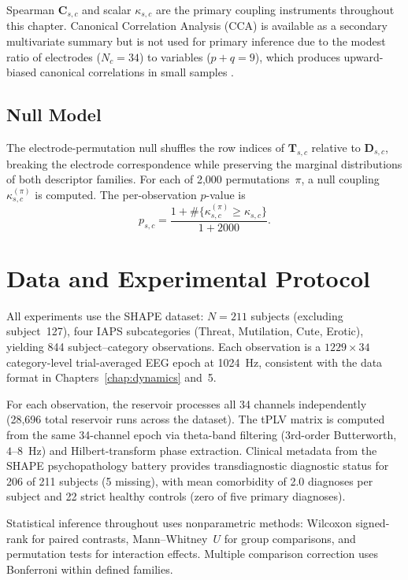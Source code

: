 Spearman $\mathbf{C}_{s,c}$ and scalar $\kappa_{s,c}$ are the primary coupling instruments throughout this chapter. Canonical Correlation Analysis (CCA) is available as a secondary multivariate summary but is not used for primary inference due to the modest ratio of electrodes ($N_c = 34$) to variables ($p + q = 9$), which produces upward-biased canonical correlations in small samples \cite{wang_cca_2020}.

\subsection{Null Model}

The electrode-permutation null shuffles the row indices of $\mathbf{T}_{s,c}$ relative to $\mathbf{D}_{s,c}$, breaking the electrode correspondence while preserving the marginal distributions of both descriptor families. For each of 2,000 permutations~$\pi$, a null coupling $\kappa_{s,c}^{(\pi)}$ is computed. The per-observation $p$-value is
\begin{equation}
p_{s,c} = \frac{1 + \#\{\kappa_{s,c}^{(\pi)} \ge \kappa_{s,c}\}}{1 + 2000}.
\end{equation}


\section{Data and Experimental Protocol}
\label{sec:ch7_protocol}

All experiments use the SHAPE dataset: $N = 211$ subjects (excluding subject~127), four IAPS subcategories (Threat, Mutilation, Cute, Erotic), yielding 844 subject--category observations. Each observation is a $1229 \times 34$ category-level trial-averaged EEG epoch at 1024~Hz, consistent with the data format in Chapters~\ref{chap:dynamics} and~5.

For each observation, the reservoir processes all 34 channels independently (28,696 total reservoir runs across the dataset). The tPLV matrix is computed from the same 34-channel epoch via theta-band filtering (3rd-order Butterworth, $4$--$8$~Hz) and Hilbert-transform phase extraction. Clinical metadata from the SHAPE psychopathology battery provides transdiagnostic diagnostic status for 206 of 211 subjects (5 missing), with mean comorbidity of 2.0 diagnoses per subject and 22 strict healthy controls (zero of five primary diagnoses).

Statistical inference throughout uses nonparametric methods: Wilcoxon signed-rank for paired contrasts, Mann--Whitney~$U$ for group comparisons, and permutation tests for interaction effects. Multiple comparison correction uses Bonferroni within defined families.


